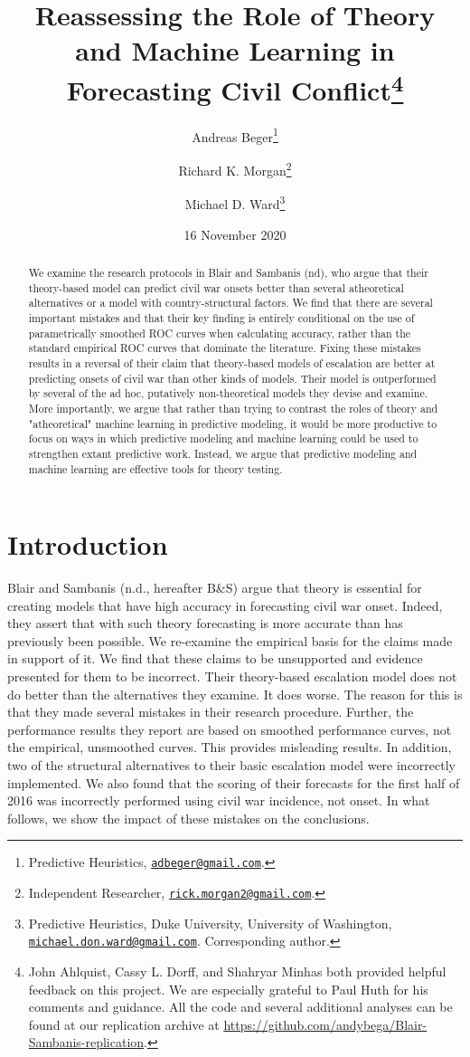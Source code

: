 \documentclass[
]{article}
\title{Reassessing the Role of Theory and Machine Learning in Forecasting Civil Conflict\thanks{John Ahlquist, Cassy L. Dorff, and Shahryar Minhas both provided helpful feedback on this project. We are especially grateful to Paul Huth for his comments and guidance. All the code and several additional analyses can be found at our replication archive at \url{https://github.com/andybega/Blair-Sambanis-replication}.}}
\author{Andreas Beger\footnote{Predictive Heuristics, \href{mailto:adbeger@gmail.com}{\nolinkurl{adbeger@gmail.com}}.} \and Richard K. Morgan\footnote{Independent Researcher, \href{mailto:rick.morgan2@gmail.com}{\nolinkurl{rick.morgan2@gmail.com}}.} \and Michael D. Ward\footnote{Predictive Heuristics, Duke University, University of Washington, \href{mailto:michael.don.ward@gmail.com}{\nolinkurl{michael.don.ward@gmail.com}}. Corresponding author.}}
\date{16 November 2020}
\begin{document}
\maketitle
\begin{abstract}
We examine the research protocols in Blair and Sambanis (nd), who argue that their theory-based model can predict civil war onsets better than several atheoretical alternatives or a model with country-structural factors. We find that there are several important mistakes and that their key finding is entirely conditional on the use of parametrically smoothed ROC curves when calculating accuracy, rather than the standard empirical ROC curves that dominate the literature. Fixing these mistakes results in a reversal of their claim that theory-based models of escalation are better at predicting onsets of civil war than other kinds of models. Their model is outperformed by several of the ad hoc, putatively non-theoretical models they devise and examine. More importantly, we argue that rather than trying to contrast the roles of theory and "atheoretical" machine learning in predictive modeling, it would be more productive to focus on ways in which predictive modeling and machine learning could be used to strengthen extant predictive work. Instead, we argue that predictive modeling and machine learning are effective tools for theory testing.
\end{abstract}

\hypertarget{introduction}{%
\section{Introduction}\label{introduction}}

Blair and Sambanis (n.d., hereafter B\&S) argue that theory is essential for creating models that have high accuracy in forecasting civil war onset. Indeed, they assert that with such theory forecasting is more accurate than has previously been possible. We re-examine the empirical basis for the claims made in support of it. We find that these claims to be unsupported and evidence presented for them to be incorrect. Their theory-based escalation model does not do better than the alternatives they examine. It does worse. The reason for this is that they made several mistakes in their research procedure. Further, the performance results they report are based on smoothed performance curves, not the empirical, unsmoothed curves. This provides misleading results. In addition, two of the structural alternatives to their basic escalation model were incorrectly implemented. We also found that the scoring of their forecasts for the first half of 2016 was incorrectly performed using civil war incidence, not onset. In what follows, we show the impact of these mistakes on the conclusions.
\end{document}
